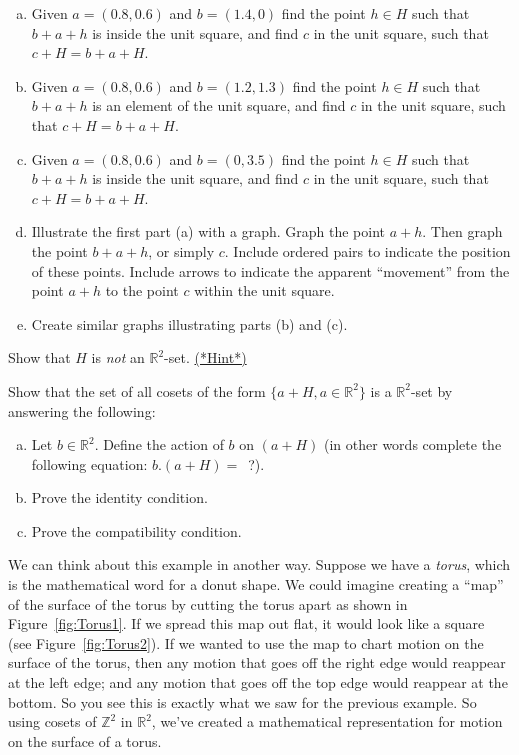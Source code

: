 \begin{exercise}\label{exercise:actions:IntLatHW1}
\begin{enumerate}[(a)]
\item Given $a=(0.8,0.6)$ and $b=(1.4,0)$ find the point $h\in H$ such that $b+a+h$ is inside the unit square, and find $c$ in the unit square, such that $c+H=b+a+H$.
\item Given $a=(0.8,0.6)$ and $b=(1.2,1.3)$ find the point $h\in H$ such that $b+a+h$ is an element of the unit square, and find $c$ in the unit square, such that $c+H=b+a+H$.
\item Given $a=(0.8,0.6)$ and $b=(0,3.5)$ find the point $h\in H$ such that $b+a+h$ is inside the unit square, and find $c$ in the unit square, such that $c+H=b+a+H$.
\item Illustrate the first part (a) with a graph.  Graph the point $a+h$.  Then graph the point $b+a+h$, or simply $c$.  Include ordered pairs to indicate the position of these points. Include arrows to indicate the apparent ``movement'' from the point $a+h$ to the point $c$ within the unit square.
\item Create similar graphs illustrating parts (b) and (c).
\end{enumerate}
\end{exercise}

\begin{exercise}\label{exercise:actions:IntLatNotGset} Show that $H$ is \emph{not} an $\mathbb{R}^2$-set. \hyperref[sec:actions:hints]{(*Hint*)}
\end{exercise}

\begin{exercise}\label{exercise:actions:SetOfCosetsGset} Show that the set of all cosets of the form $\{a+H, a \in \mathbb{R}^2\}$ is a $\mathbb{R}^2$-set by answering the following:
\begin{enumerate}[(a)]
\item Let $b \in \mathbb{R}^2$. Define the action of $b$ on $(a+H)$ (in other words complete the following equation: $b.(a+H)=$~?).
\item Prove the identity condition.
\item Prove the compatibility condition.
\end{enumerate}
\end{exercise}


We can think about this example in another way. Suppose we have a \emph{torus}, which is the mathematical word for a donut shape. We could imagine creating a ``map'' of the surface of the torus by cutting the torus apart as shown in Figure~\ref{fig:Torus1}. If we spread this map out flat, it would look like a square (see Figure~\ref{fig:Torus2}). If we wanted to use the map to chart motion on the surface of the torus, then any motion that goes off the right edge would reappear at the left edge; and any motion that goes off the top edge would reappear at the bottom. So you see this is exactly what we saw for the previous example. So using cosets of $\mathbb{Z}^2$ in $\mathbb{R}^2$, we've created a mathematical representation for motion on the surface of a torus.

